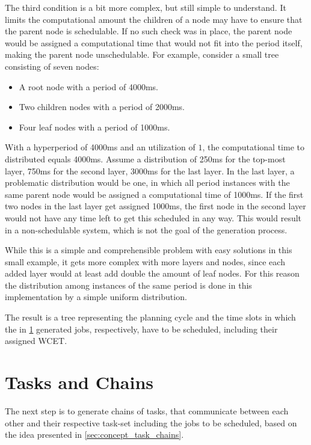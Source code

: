The third condition is a bit more complex, but still simple to understand.
It limits the computational amount the children of a node may have to ensure that the parent node is schedulable.
If no such check was in place, the parent node would be assigned a computational time that would not fit into the period itself, making the parent node unschedulable.
For example, consider a small tree consisting of seven nodes:
\begin{itemize}
\item A root node with a period of 4000ms.
\item Two children nodes with a period of 2000ms.
\item Four leaf nodes with a period of 1000ms.
\end{itemize}
With a hyperperiod of 4000ms and an utilization of $1$, the computational time to distributed equals 4000ms.
Assume a distribution of 250ms for the top-most layer, 750ms for the second layer, 3000ms for the last layer.
In the last layer, a problematic distribution would be one, in which all period instances with the same parent node would be assigned a computational time of 1000ms.
If the first two nodes in the last layer get assigned 1000ms, the first node in the second layer would not have any time left to get this scheduled in any way.
This would result in a non-schedulable system, which is not the goal of the generation process.

While this is a simple and comprehensible problem with easy solutions in this small example, it gets more complex with more layers and nodes, since each added layer would at least add double the amount of leaf nodes.
For this reason the distribution among instances of the same period is done in this implementation by a simple uniform distribution.

The result is a tree representing the planning cycle and the time slots in which the in \cref{subsec:impl:tasks-and-chains} generated jobs, respectively, have to be scheduled, including their assigned \ac{WCET}.

\section{Tasks and Chains}\label{subsec:impl:tasks-and-chains}
The next step is to generate chains of tasks, that communicate between each other and their respective task-set including the jobs to be scheduled, based on the idea presented in \cref{sec:concept_task_chains}.

